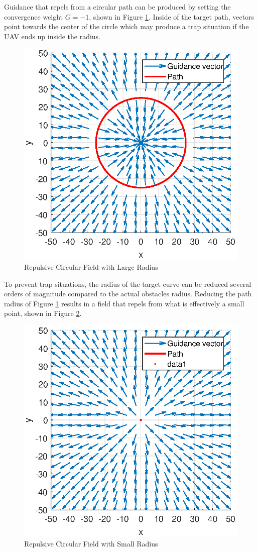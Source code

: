 \documentclass[numbered,pdftex]{ohio-etd}
\begin{document}
Guidance that repels from a circular path can be produced by setting the convergence weight $G=-1$, shown in Figure \ref{fig:largerepulsive}. Inside of the target path, vectors point towards the center of the circle which may produce a trap situation if the UAV ends up inside the radius.

\begin{figure}[H]
	\centering
	\includegraphics[width=0.7\linewidth]{Figures/methods/largeRepulsive}
	\caption{Repulsive Circular Field with Large Radius}
	\label{fig:largerepulsive}
\end{figure}

To prevent trap situations, the radius of the target curve can be reduced several orders of magnitude compared to the actual obstacles radius. Reducing the path radius of Figure \ref{fig:largerepulsive} results in a field that repels from what is effectively a small point, shown in Figure \ref{fig:normalizedrepulsive}.


\begin{figure}[H]
	\centering
	\includegraphics[width=0.7\linewidth]{Figures/methods/normalizedRepulsive}
	\caption{Repulsive Circular Field with Small Radius}
	\label{fig:normalizedrepulsive}
\end{figure}
\end{document}
